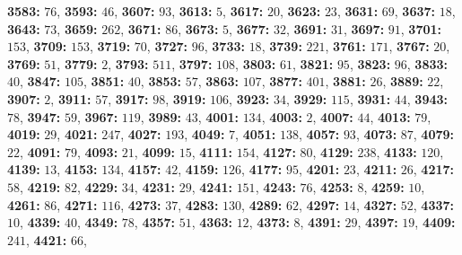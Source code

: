 \textsf{\bfseries 3583:} $76$, \textsf{\bfseries 3593:} $46$, \textsf{\bfseries 3607:} $93$, \textsf{\bfseries 3613:} $5$, \textsf{\bfseries 3617:} $20$, \textsf{\bfseries 3623:} $23$, \textsf{\bfseries 3631:} $69$, \textsf{\bfseries 3637:} $18$, \textsf{\bfseries 3643:} $73$, \textsf{\bfseries 3659:} $262$, \textsf{\bfseries 3671:} $86$, \textsf{\bfseries 3673:} $5$, \textsf{\bfseries 3677:} $32$, \textsf{\bfseries 3691:} $31$, \textsf{\bfseries 3697:} $91$, \textsf{\bfseries 3701:} $153$, \textsf{\bfseries 3709:} $153$, \textsf{\bfseries 3719:} $70$, \textsf{\bfseries 3727:} $96$, \textsf{\bfseries 3733:} $18$, \textsf{\bfseries 3739:} $221$, \textsf{\bfseries 3761:} $171$, \textsf{\bfseries 3767:} $20$, \textsf{\bfseries 3769:} $51$, \textsf{\bfseries 3779:} $2$, \textsf{\bfseries 3793:} $511$, \textsf{\bfseries 3797:} $108$, \textsf{\bfseries 3803:} $61$, \textsf{\bfseries 3821:} $95$, \textsf{\bfseries 3823:} $96$, \textsf{\bfseries 3833:} $40$, \textsf{\bfseries 3847:} $105$, \textsf{\bfseries 3851:} $40$, \textsf{\bfseries 3853:} $57$, \textsf{\bfseries 3863:} $107$, \textsf{\bfseries 3877:} $401$, \textsf{\bfseries 3881:} $26$, \textsf{\bfseries 3889:} $22$, \textsf{\bfseries 3907:} $2$, \textsf{\bfseries 3911:} $57$, \textsf{\bfseries 3917:} $98$, \textsf{\bfseries 3919:} $106$, \textsf{\bfseries 3923:} $34$, \textsf{\bfseries 3929:} $115$, \textsf{\bfseries 3931:} $44$, \textsf{\bfseries 3943:} $78$, \textsf{\bfseries 3947:} $59$, \textsf{\bfseries 3967:} $119$, \textsf{\bfseries 3989:} $43$, \textsf{\bfseries 4001:} $134$, \textsf{\bfseries 4003:} $2$, \textsf{\bfseries 4007:} $44$, \textsf{\bfseries 4013:} $79$, \textsf{\bfseries 4019:} $29$, \textsf{\bfseries 4021:} $247$, \textsf{\bfseries 4027:} $193$, \textsf{\bfseries 4049:} $7$, \textsf{\bfseries 4051:} $138$, \textsf{\bfseries 4057:} $93$, \textsf{\bfseries 4073:} $87$, \textsf{\bfseries 4079:} $22$, \textsf{\bfseries 4091:} $79$, \textsf{\bfseries 4093:} $21$, \textsf{\bfseries 4099:} $15$, \textsf{\bfseries 4111:} $154$, \textsf{\bfseries 4127:} $80$, \textsf{\bfseries 4129:} $238$, \textsf{\bfseries 4133:} $120$, \textsf{\bfseries 4139:} $13$, \textsf{\bfseries 4153:} $134$, \textsf{\bfseries 4157:} $42$, \textsf{\bfseries 4159:} $126$, \textsf{\bfseries 4177:} $95$, \textsf{\bfseries 4201:} $23$, \textsf{\bfseries 4211:} $26$, \textsf{\bfseries 4217:} $58$, \textsf{\bfseries 4219:} $82$, \textsf{\bfseries 4229:} $34$, \textsf{\bfseries 4231:} $29$, \textsf{\bfseries 4241:} $151$, \textsf{\bfseries 4243:} $76$, \textsf{\bfseries 4253:} $8$, \textsf{\bfseries 4259:} $10$, \textsf{\bfseries 4261:} $86$, \textsf{\bfseries 4271:} $116$, \textsf{\bfseries 4273:} $37$, \textsf{\bfseries 4283:} $130$, \textsf{\bfseries 4289:} $62$, \textsf{\bfseries 4297:} $14$, \textsf{\bfseries 4327:} $52$, \textsf{\bfseries 4337:} $10$, \textsf{\bfseries 4339:} $40$, \textsf{\bfseries 4349:} $78$, \textsf{\bfseries 4357:} $51$, \textsf{\bfseries 4363:} $12$, \textsf{\bfseries 4373:} $8$, \textsf{\bfseries 4391:} $29$, \textsf{\bfseries 4397:} $19$, \textsf{\bfseries 4409:} $241$, \textsf{\bfseries 4421:} $66$, 
